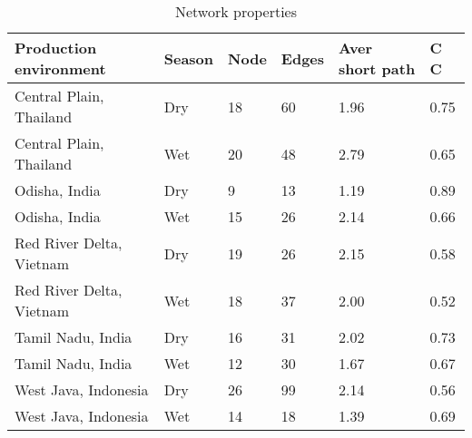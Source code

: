 \begin{table}
\centering
\label{table:network_prop}
\caption{Network properties}
\begin{tabular}{llllll}
\hline
Production environment   & Season & Node & Edges & Aver short path & C C \\
\hline
Central Plain, Thailand  & Dry    & 18   & 60    & 1.96               & 0.75                   \\
Central Plain, Thailand  & Wet    & 20   & 48    & 2.79               & 0.65                   \\
Odisha, India            & Dry    & 9    & 13    & 1.19               & 0.89                   \\
Odisha, India            & Wet    & 15   & 26    & 2.14               & 0.66                   \\
Red River Delta, Vietnam & Dry    & 19   & 26    & 2.15               & 0.58                   \\
Red River Delta, Vietnam & Wet    & 18   & 37    & 2.00               & 0.52                   \\
Tamil Nadu, India        & Dry    & 16   & 31    & 2.02               & 0.73                   \\
Tamil Nadu, India        & Wet    & 12   & 30    & 1.67               & 0.67                   \\
West Java, Indonesia     & Dry    & 26   & 99    & 2.14               & 0.56                   \\
West Java, Indonesia     & Wet    & 14   & 18    & 1.39               & 0.69                   \\
\hline
\end{tabular}
\end{table}